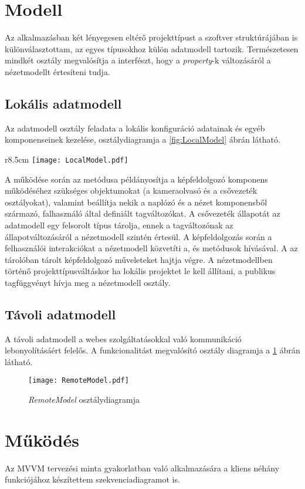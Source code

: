 \section{Modell}

Az alkalmazásban két lényegesen eltérő projekttípust a szoftver struktúrájában is különválasztottam, az egyes típusokhoz külön adatmodell tartozik. Természetesen mindkét osztály megvalósítja a  interfészt, hogy a \emph{property}-k változásáról a nézetmodellt értesíteni tudja. 

\subsection{Lokális adatmodell}

Az adatmodell osztály feladata a lokális konfiguráció adatainak és egyéb komponenseinek kezelése, osztálydiagramja a \ref{fig:LocalModel}  ábrán látható. 
\begin{wrapfigure}{r}{8.5cm}
\texttt{[image: LocalModel.pdf]}
\caption{ osztálydiagram}\label{fig:LocalModel}
\end{wrapfigure} 

A működése során az  metódusa példányosítja a képfeldolgozó komponens működéséhez szükséges objektumokat (a kameraolvasó és a csővezeték osztályokat), valamint beállítja nekik a naplózó és a nézet komponensből származó, falhasználó által definiált tagváltozókat. A csővezeték állapotát az adatmodell egy felsorolt típus tárolja, ennek a tagváltozónak az állapotváltozásáról a nézetmodell szintén értesül. A képfeldolgozás során a felhasználói interakciókat a nézetmodell közvetíti a,  és  metódusok hívásával. A  az  tárolóban tárolt képfeldolgozó műveleteket hajtja végre. A nézetmodellben történő projekttípusváltáskor ha lokális projektet le kell állítani, a  publikus tagfüggvényt hívja meg a nézetmodell osztály.

\subsection{Távoli adatmodell}

A távoli adatmodell a webes szolgáltatásokkal való kommunikáció lebonyolításáért felelős. A funkcionalitást megvalósító osztály diagramja a \ref{fig:RemoteModel} ábrán látható. \\


\begin{figure}[h]
\vspace{.5cm}
\texttt{[image: RemoteModel.pdf]}
\centering
\vspace{.2cm}
\caption{\emph{RemoteModel} osztálydiagramja}
\vspace{.5cm}
\label{fig:RemoteModel}
\end{figure}

\section{Működés}

Az MVVM tervezési minta gyakorlatban való alkalmazására a kliens néhány funkciójához készítettem szekvenciadiagramot is.
